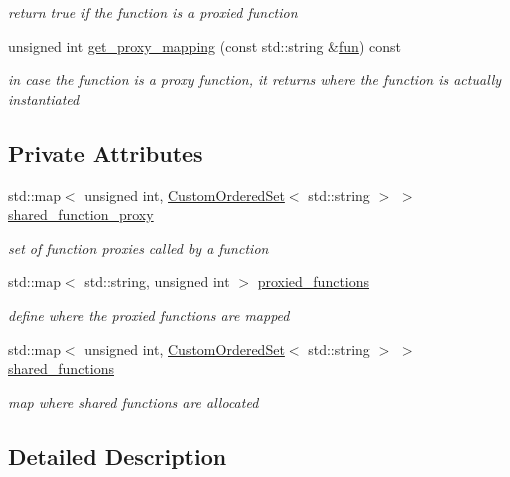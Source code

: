 \begin{DoxyCompactItemize}
\begin{DoxyCompactList}\small\item\em return true if the function is a proxied function \end{DoxyCompactList}\item 
unsigned int \hyperlink{classfunctions_aad881194f6ac949db8171c00ec263021}{get\+\_\+proxy\+\_\+mapping} (const std\+::string \&\hyperlink{tutorial__pact__2019_2Introduction_2fourth_2module_8c_a0a2db8044a7b4ea68582e434d4f4692c}{fun}) const
\begin{DoxyCompactList}\small\item\em in case the function is a proxy function, it returns where the function is actually instantiated \end{DoxyCompactList}\end{DoxyCompactItemize}
\subsection*{Private Attributes}
\begin{DoxyCompactItemize}
\item 
std\+::map$<$ unsigned int, \hyperlink{classCustomOrderedSet}{Custom\+Ordered\+Set}$<$ std\+::string $>$ $>$ \hyperlink{classfunctions_adb64aa230ffa11fb78fc2a031002b584}{shared\+\_\+function\+\_\+proxy}
\begin{DoxyCompactList}\small\item\em set of function proxies called by a function \end{DoxyCompactList}\item 
std\+::map$<$ std\+::string, unsigned int $>$ \hyperlink{classfunctions_a68eefa9220caa56e0264cef91a024edb}{proxied\+\_\+functions}
\begin{DoxyCompactList}\small\item\em define where the proxied functions are mapped \end{DoxyCompactList}\item 
std\+::map$<$ unsigned int, \hyperlink{classCustomOrderedSet}{Custom\+Ordered\+Set}$<$ std\+::string $>$ $>$ \hyperlink{classfunctions_ad71c1e9d1b6810de5e9a7591e6b3ebb8}{shared\+\_\+functions}
\begin{DoxyCompactList}\small\item\em map where shared functions are allocated \end{DoxyCompactList}\end{DoxyCompactItemize}


\subsection{Detailed Description}


